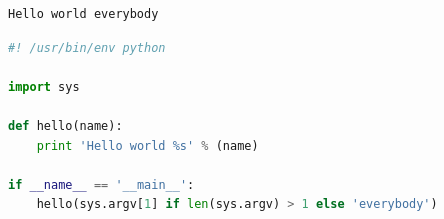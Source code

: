 \begin{lstlisting}[language={},caption={Sortie standard},label={lst:monnom:outhello}]
Hello world everybody
\end{lstlisting}

\begin{lstlisting}[language={Python},caption={Mon premier code},label={lst:monnom:helloword}]
#! /usr/bin/env python

import sys

def hello(name):
    print 'Hello world %s' % (name)

if __name__ == '__main__':
    hello(sys.argv[1] if len(sys.argv) > 1 else 'everybody')
\end{lstlisting}


